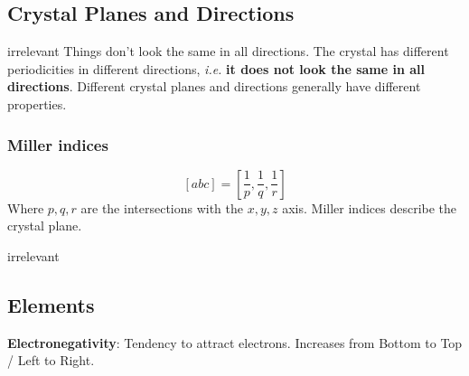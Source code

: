 \documentclass[a4paper, fontsize=8pt, landscape, DIV=1]{scrartcl}
\newcommand{\makeultracompact}{irrelevant}
\begin{document}
\begin{multicols*}{4}
  \subsection{Crystal Planes and Directions}
  \ifdefined\makeultracompact\else
    Things don't look the same in all directions. 
    The crystal has different periodicities in different directions, \textit{i.e.} \textbf{it does not look the same in all directions}. 
    Different crystal planes and directions generally have different properties.
  \fi
  
  \subsubsection{Miller indices}
  \[[abc] = \left[\frac{1}{p},\frac{1}{q},\frac{1}{r}\right]\]
  Where $p,q,r$ are the intersections with the $x,y,z$ axis. Miller indices describe the crystal plane.
  
  \ifdefined\makeultracompact\else
    \subsection{Elements}
    \textbf{Electronegativity}: Tendency to attract electrons. Increases from Bottom to Top / Left to Right.
  \fi



\end{multicols*}
\end{document}
